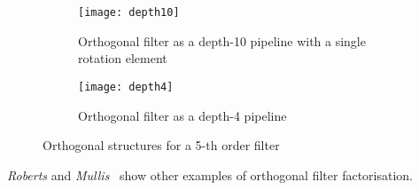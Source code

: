 \documentclass[a4paper,twoside,10pt,english]{report}
\begin{document}
\begin{figure}[!htbp]
\begin{center}
\begin{subfigure}{\textwidth}
\begin{center}
\texttt{[image: depth10]}
\caption{Orthogonal filter as a depth-10 pipeline with a single rotation element}
\label{subfig:Orthogonal-filter-as-depth-10-pipeline}
\vspace{1cm}
\end{center}
\end{subfigure}
\begin{subfigure}{\textwidth}
\begin{center}
\texttt{[image: depth4]}
\caption{Orthogonal filter as a depth-4 pipeline}
\label{subfig:Orthogonal-filter-as-depth-4-pipeline}
\end{center}
\end{subfigure}
\caption{Orthogonal structures for a 5-th order filter}
\end{center}
\end{figure}

\emph{Roberts} and
\emph{Mullis}~\cite[pp. 462-467]{RobertsMullis_DigitalSignalProcessing} show
other examples of orthogonal filter factorisation.
\cleardoublepage{}
\end{document}
